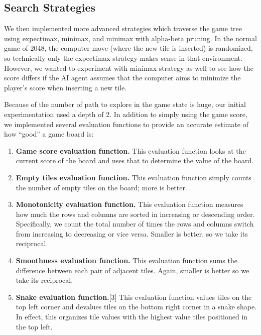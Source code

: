 \documentclass[9pt,twocolumn]{article}
\begin{document}
\subsection{Search Strategies}

We then implemented more advanced strategies which traverse the game tree using expectimax, minimax, and minimax with alpha-beta pruning. In the normal game of 2048, the computer move (where the new tile is inserted) is randomized, so technically only the expectimax strategy makes sense in that environment. However, we wanted to experiment with minimax strategy as well to see how the score differs if the AI agent assumes that the computer aims to minimize the player’s score when inserting a new tile.

Because of the number of path to explore in the game state is huge, our initial experimentation used a depth of 2. In addition to simply using the game score, we implemented several evaluation functions to provide an accurate estimate of how “good” a game board is:

\begin{enumerate}

\item \textbf{Game score evaluation function.} This evaluation function looks at the current score of the board and uses that to determine the value of the board.
\item \textbf{Empty tiles evaluation function.} This evaluation function simply counts the number of empty tiles on the board; more is better.
\item \textbf{Monotonicity evaluation function.} This evaluation function measures how much the rows and columns are sorted in increasing or descending order. Specifically, we count the total number of times the rows and columns switch from increasing to decreasing or vice versa. Smaller is better, so we take its reciprocal.
\item \textbf{Smoothness evaluation function.} This evaluation function sums the difference between each pair of adjacent tiles. Again, smaller is better so we take its reciprocal.
\item \textbf{Snake evaluation function.}[3] This evaluation function values tiles on the top left corner and devalues tiles on the bottom right corner in a snake shape. In effect, this organizes tile values with the highest value tiles positioned in the top left.

\end{enumerate}
\end{document}
